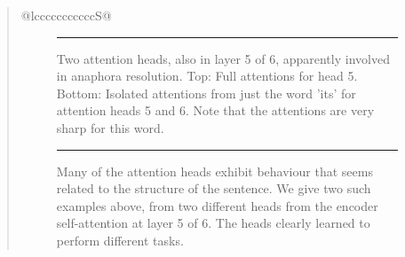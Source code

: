 \documentclass[12pt, a4paper]{article}
\begin{document}
\begin{abstract}
\begin{table}[htbp]
\begin{tabular}{@{}lcccccccccccS@{}}
\begin{figure}[htbp]
    \centering
    \rule{\textwidth}{5cm} %
    \caption{Two attention heads, also in layer 5 of 6, apparently involved in anaphora resolution. Top: Full attentions for head 5. Bottom: Isolated attentions from just the word 'its' for attention heads 5 and 6. Note that the attentions are very sharp for this word.}
    \label{fig:attention_anaphora}
\end{figure}

\begin{figure}[htbp]
    \centering
    \rule{\textwidth}{5cm} %
    \caption{Many of the attention heads exhibit behaviour that seems related to the structure of the sentence. We give two such examples above, from two different heads from the encoder self-attention at layer 5 of 6. The heads clearly learned to perform different tasks.}
    \label{fig:attention_structure}
\end{figure}


\end{tabular}
\end{table}
\end{abstract}
\end{document}

